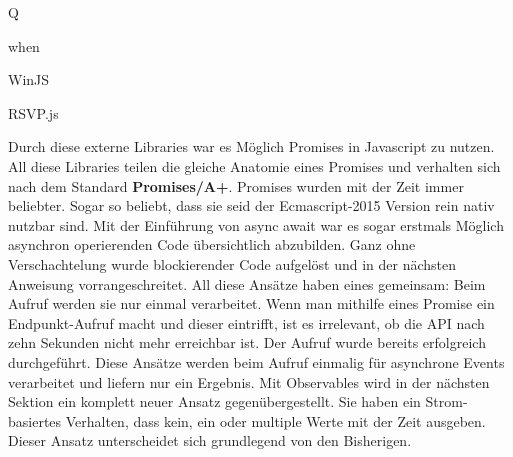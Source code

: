 \begin{description}
\item Q
\item when
\item WinJS
\item RSVP.js
\end{description}

\noindent
Durch diese externe Libraries war es Möglich Promises in Javascript zu nutzen. All diese Libraries teilen die gleiche Anatomie eines Promises und verhalten sich nach dem Standard \textbf{Promises/A+}.\cite{promises-a+} Promises wurden mit der Zeit immer beliebter. Sogar so beliebt, dass sie seid der Ecmascript-2015 Version rein nativ nutzbar sind. Mit der Einführung von async await war es sogar erstmals Möglich asynchron operierenden Code übersichtlich abzubilden. Ganz ohne Verschachtelung wurde blockierender Code aufgelöst und in der nächsten Anweisung vorrangeschreitet. All diese Ansätze haben eines gemeinsam: Beim Aufruf werden sie nur einmal verarbeitet. Wenn man mithilfe eines Promise ein Endpunkt-Aufruf macht und dieser eintrifft, ist es irrelevant, ob die API nach zehn Sekunden nicht mehr erreichbar ist. Der Aufruf wurde bereits erfolgreich durchgeführt. Diese Ansätze werden beim Aufruf einmalig für asynchrone Events verarbeitet und liefern nur ein Ergebnis. Mit Observables wird in der nächsten Sektion ein komplett neuer Ansatz gegenübergestellt. Sie haben ein Strom-basiertes Verhalten, dass kein, ein oder multiple Werte mit der Zeit ausgeben. Dieser Ansatz unterscheidet sich grundlegend von den Bisherigen.
